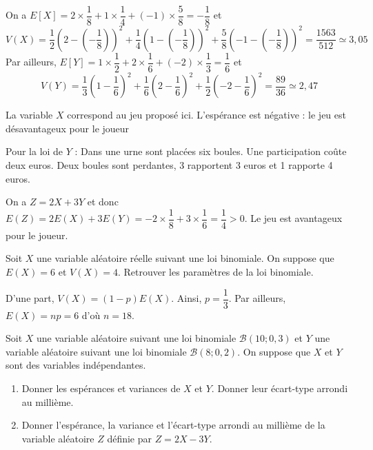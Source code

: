 \documentclass[11pt,fleqn, openany]{book} %
\begin{document}
\begin{solution}On a  $E[X] = 2 \times \dfrac{1}{8} + 1 \times \dfrac{1}{4} + (-1) \times \dfrac{5}{8} = -\dfrac{1}{8}$ et
\[ V(X)= \dfrac{1}{2}\left(2- \left(-\dfrac{1}{8}\right)\right)^2+\dfrac{1}{4}\left(1-\left(-\dfrac{1}{8}\right)\right)^2+\dfrac{5}{8}\left(-1-\left(-\dfrac{1}{8}\right)\right)^2 = \dfrac{1563}{512}\simeq 3,05\]
Par ailleurs, $E[Y]=1 \times \dfrac{1}{2}+ 2 \times \dfrac{1}{6} + (-2) \times \dfrac{1}{3} = \dfrac{1}{6}$ et
\[ V(Y)= \dfrac{1}{3}\left(1- \dfrac{1}{6}\right)^2+\dfrac{1}{6}\left(2-\dfrac{1}{6}\right)^2+\dfrac{1}{2}\left(-2-\dfrac{1}{6}\right)^2 = \dfrac{89}{36}\simeq 2,47\]

La variable $X$ correspond au jeu proposé ici. L'espérance est négative : le jeu est désavantageux pour le joueur

Pour la loi de $Y$ : Dans une urne sont placées six boules. Une participation coûte deux euros. Deux boules sont perdantes, 3 rapportent 3 euros et 1 rapporte 4 euros.

On a $Z=2X+3Y$ et donc $E(Z)=2E(X)+ 3 E(Y)= -2\times \dfrac{1}{8} + 3 \times \dfrac{1}{6}=\dfrac{1}{4}>0$. Le jeu est avantageux pour le joueur.\end{solution}




\begin{exercise}[topic=lgn02]Soit $X$ une variable aléatoire réelle suivant une loi binomiale. On suppose que $E(X)=6$ et $V(X)=4$. Retrouver les paramètres de la loi binomiale.\end{exercise}

\begin{solution}D'une part, $V(X)=(1-p)E(X)$. Ainsi, $p=\dfrac{1}{3}$. Par ailleurs, $E(X)=np=6$ d'où $n=18$.\end{solution}



\begin{exercise}[topic=lgn02]
Soit $X$ une variable aléatoire suivant une loi binomiale $\mathcal{B}(10 ; 0,3)$ et $Y$ une variable aléatoire suivant une loi binomiale $\mathcal{B}(8;0,2)$. On suppose que $X$ et $Y$ sont des variables indépendantes.
\begin{enumerate}
\item Donner les espérances et variances de $X$ et $Y$. Donner leur écart-type arrondi au millième.
\item Donner l'espérance, la variance et l'écart-type arrondi au millième de la variable aléatoire $Z$ définie par $Z=2X-3Y$.
\end{enumerate}\end{exercise}
\end{document}
